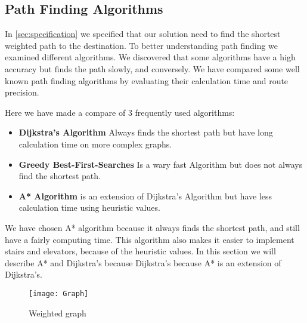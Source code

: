 

\subsection{Path Finding Algorithms}

  In \cref{sec:specification} we specified that our solution need to find the shortest weighted path to the destination.
  To better understanding path finding we examined different algorithms. We discovered that some algorithms have a high accuracy but finds the path slowly, and conversely.
  We have compared some well known path finding algorithms by evaluating their calculation time and route precision.

  Here we have made a compare of 3 frequently used algorithms: 
  \begin{itemize}
  \setlength{\itemsep}{1pt}
  \setlength{\parskip}{0pt}
  \setlength{\parsep}{0pt}
  \item \textbf{Dijkstra's Algorithm} Always finds the shortest path but have long calculation time on more complex graphs.
  \item \textbf{Greedy Best-First-Searches} Is a wary fast Algorithm but does not always find the shortest path.
  \item \textbf{A* Algorithm} is an extension of Dijkstra's Algorithm but have less calculation time using heuristic values.
\end{itemize}

We have chosen A* algorithm because it always finds the shortest path, and still have a fairly computing time. This algorithm also makes it easier to implement stairs and elevators, because of the heuristic values. In this section we will describe A* and Dijkstra's because Dijkstra's because A* is an extension of Dijkstra's.




  \begin{figure}[ht!]
    \centering
    \texttt{[image: Graph]}
    \caption{Weighted graph}
    \label{fig:graph}
  \end{figure}

